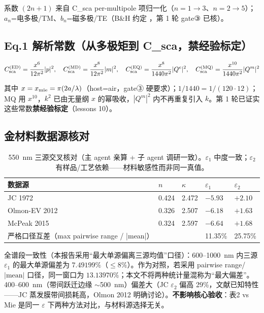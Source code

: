 系数 $(2n+1)$ 来自 C\_sca per-multipole 项归一化（$n=1\rightarrow3$、$n=2\rightarrow5$）；$a_n$=电多极/TM、$b_n$=磁多极/TE（B\&H 约定 \cite{Bohren1983}，第 1 轮 gate③ 已核）。

\subsection{Eq.1 解析常数（从多极矩到 C\_sca，禁经验标定）}

\begin{equation}
C_{\rm sca}^{(\rm ED)} = \frac{x^6}{12\pi^2}|p|^2,\quad
C_{\rm sca}^{(\rm MD)} = \frac{x^8}{12\pi^2}|m|^2,\quad
C_{\rm sca}^{(\rm EQ)} = \frac{x^8}{1440\pi^2}|Q^e|^2,\quad
C_{\rm sca}^{(\rm MQ)} = \frac{x^{10}}{1440\pi^2}|Q^m|^2
\end{equation}

其中 $x = x_{\rm mie} = \pi(2a/\lambda)$（host=air，gate③ 硬要求）；$1/1440 = 1/(120\cdot12)$；MQ 用 $x^{10}$，$k^2$ 已由无量纲 $x$ 的幂吸收，$|Q^m|^2$ 内不再重复引入 $k$。第 1 轮已证实这些常数\textbf{禁经验标定}（lessons 10）。

\subsection{金材料数据源核对}

\begin{table}[H]
\centering
\small
\begin{tabular}{lllll}
\toprule
数据源 & $n$ & $\kappa$ & $\varepsilon_1$ & $\varepsilon_2$ \\
\midrule
JC 1972 \cite{JohnsonChristy1972} & 0.424 & 2.472 & $-5.93$ & $+2.10$ \\
Olmon-EV 2012 \cite{Olmon2012} & 0.326 & 2.507 & $-6.18$ & $+1.63$ \\
McPeak 2015 \cite{McPeak2015} & 0.324 & 2.597 & $-6.64$ & $+1.68$ \\
\midrule
严格口径互差（max pairwise range / |mean|） & & & 11.35\% & 25.75\% \\
\bottomrule
\end{tabular}
\caption{550~nm 三源交叉核对（主 agent 亲算 + 子 agent 调研一致）。$\varepsilon_1$ 中度一致；$\varepsilon_2$ 有样品/工艺依赖——材料敏感性而非同一真值。}
\label{tab:gold550}
\end{table}

全谱段一致性（本报告采用“最大单源偏离三源均值”口径）：600--1000~nm 内三源 $\varepsilon_1$ 的最大单源偏差为 $7.49199\%$（$\leq 8\%$）。作为对照，若采用 pairwise range/$|\mathrm{mean}|$ 口径，同一窗口为 $13.13970\%$；本文不将两种统计量混称为“最大偏差”。400--600~nm（带间跃迁边缘 $\sim$500~nm）偏差大（JC $\varepsilon_2$ 偏高 29\%，文献已知特性——JC 蒸发膜带间损耗高，Olmon 2012 明确讨论）。\textbf{不影响核心验收}：表2 vs Mie 是同一 $\varepsilon$ 下两种方法对比，与材料源选择无关。

